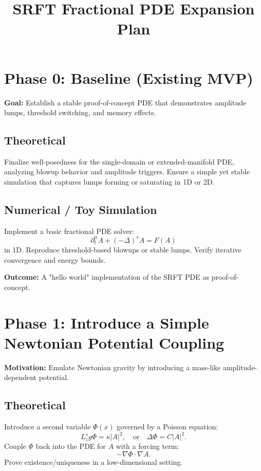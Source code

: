 \documentclass{article}
\title{SRFT Fractional PDE Expansion Plan}
\author{}
\date{}
\begin{document}
\maketitle

\section{Phase 0: Baseline (Existing MVP)}

\textbf{Goal:} Establish a stable proof-of-concept PDE that demonstrates amplitude lumps, threshold switching, and memory effects.

\subsection{Theoretical}
Finalize well-posedness for the single-domain or extended-manifold PDE, analyzing blowup behavior and amplitude triggers.
Ensure a simple yet stable simulation that captures lumps forming or saturating in 1D or 2D.

\subsection{Numerical / Toy Simulation}
Implement a basic fractional PDE solver:
\begin{equation}
    \partial_t^{\alpha} A + (-\Delta)^s A = F(A)
\end{equation}
in 1D.
Reproduce threshold-based blowups or stable lumps.
Verify iterative convergence and energy bounds.

\textbf{Outcome:} A "hello world" implementation of the SRFT PDE as proof-of-concept.

\section{Phase 1: Introduce a Simple Newtonian Potential Coupling}

\textbf{Motivation:} Emulate Newtonian gravity by introducing a mass-like amplitude-dependent potential.

\subsection{Theoretical}
Introduce a second variable $\Phi(x)$ governed by a Poisson equation:
\begin{equation}
    L_z^s g \Phi = \kappa |A|^2, \quad \text{or} \quad \Delta \Phi = C |A|^2.
\end{equation}
Couple $\Phi$ back into the PDE for $A$ with a forcing term:
\begin{equation}
    - \nabla \Phi \cdot \nabla A.
\end{equation}
Prove existence/uniqueness in a low-dimensional setting.
\end{document}
